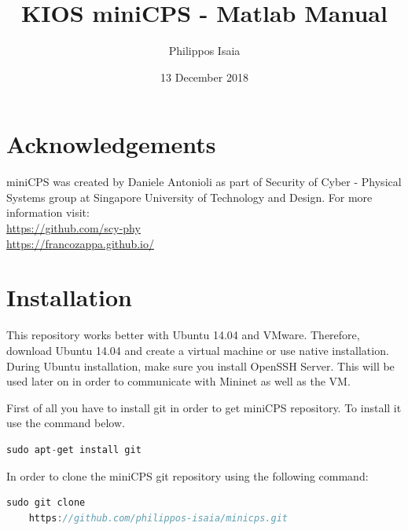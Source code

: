 \documentclass[book,a4paper,12pt]{memoir}
\begin{document}
\openany
\title{KIOS miniCPS - Matlab Manual}
\author{Philippos Isaia}
\date{13 December 2018}
\maketitle
\frontmatter
\tableofcontents
\chapter{Acknowledgements}
\label{cha:ack}

miniCPS was created by Daniele Antonioli as part of Security of Cyber - Physical Systems group at Singapore University of Technology and Design.
For more information visit: \\
\url{https://github.com/scy-phy} \\
\url{https://francozappa.github.io/}

\mainmatter
\chapter{Installation}
\label{cha:install}
This repository works better with Ubuntu 14.04 and VMware.  Therefore, download Ubuntu 14.04 and create a virtual machine or use native installation.  During Ubuntu installation, make sure you install OpenSSH Server.  This will be used later on in order to communicate with Mininet as well as the VM.

First of all you have to install git in order to get miniCPS repository.  To install it use the command below.

\begin{lstlisting}[backgroundcolor = \color{ultralightgray}, language = C, xleftmargin = 0.1cm, framexleftmargin = 0.3em, showstringspaces=false]
sudo apt-get install git
\end{lstlisting}

In order to clone the miniCPS git repository using the following command:
 
\begin{lstlisting}[backgroundcolor = \color{ultralightgray}, language = C, xleftmargin = 0.1cm, framexleftmargin = 0.3em, showstringspaces=false]
sudo git clone
    https://github.com/philippos-isaia/minicps.git
\end{lstlisting}
\end{document}
